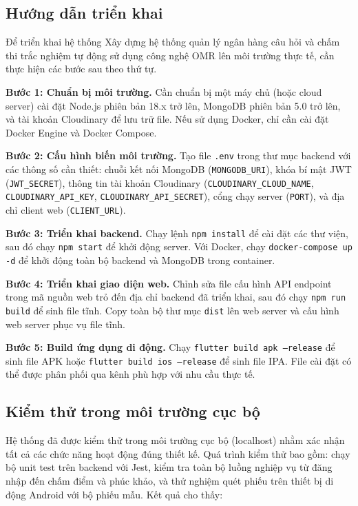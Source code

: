 ﻿\documentclass[../DoAn.tex]{subfiles}
\begin{document}
\subsection{Hướng dẫn triển khai}

Để triển khai hệ thống Xây dựng hệ thống quản lý ngân hàng câu hỏi và chấm thi trắc nghiệm tự động sử dụng công nghệ OMR lên môi trường thực tế, cần thực hiện các bước sau theo thứ tự.

\noindent\textbf{Bước 1: Chuẩn bị môi trường.} Cần chuẩn bị một máy chủ (hoặc cloud server) cài đặt Node.js phiên bản 18.x trở lên, MongoDB phiên bản 5.0 trở lên, và tài khoản Cloudinary để lưu trữ file. Nếu sử dụng Docker, chỉ cần cài đặt Docker Engine và Docker Compose.

\noindent\textbf{Bước 2: Cấu hình biến môi trường.} Tạo file \texttt{.env} trong thư mục backend với các thông số cần thiết: chuỗi kết nối MongoDB (\texttt{MONGODB\_URI}), khóa bí mật JWT (\texttt{JWT\_SECRET}), thông tin tài khoản Cloudinary (\texttt{CLOUDINARY\_CLOUD\_NAME}, \texttt{CLOUDINARY\_API\_KEY}, \texttt{CLOUDINARY\_API\_SECRET}), cổng chạy server (\texttt{PORT}), và địa chỉ client web (\texttt{CLIENT\_URL}).

\noindent\textbf{Bước 3: Triển khai backend.} Chạy lệnh \texttt{npm install} để cài đặt các thư viện, sau đó chạy \texttt{npm start} để khởi động server. Với Docker, chạy \texttt{docker-compose up -d} để khởi động toàn bộ backend và MongoDB trong container.

\noindent\textbf{Bước 4: Triển khai giao diện web.} Chỉnh sửa file cấu hình API endpoint trong mã nguồn web trỏ đến địa chỉ backend đã triển khai, sau đó chạy \texttt{npm run build} để sinh file tĩnh. Copy toàn bộ thư mục \texttt{dist} lên web server và cấu hình web server phục vụ file tĩnh.

\noindent\textbf{Bước 5: Build ứng dụng di động.} Chạy \texttt{flutter build apk --release} để sinh file APK hoặc \texttt{flutter build ios --release} để sinh file IPA. File cài đặt có thể được phân phối qua kênh phù hợp với nhu cầu thực tế.

\subsection{Kiểm thử trong môi trường cục bộ}

Hệ thống đã được kiểm thử trong môi trường cục bộ (localhost) nhằm xác nhận tất cả các chức năng hoạt động đúng thiết kế. Quá trình kiểm thử bao gồm: chạy bộ unit test trên backend với Jest, kiểm tra toàn bộ luồng nghiệp vụ từ đăng nhập đến chấm điểm và phúc khảo, và thử nghiệm quét phiếu trên thiết bị di động Android với bộ phiếu mẫu. Kết quả cho thấy:
\end{document}
